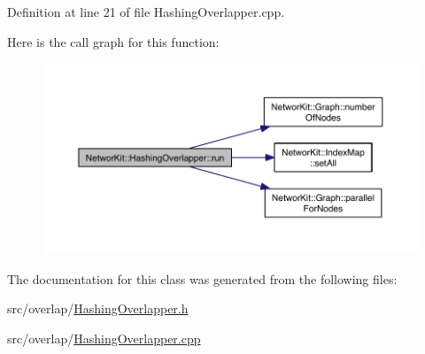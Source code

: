 Definition at line 21 of file Hashing\-Overlapper.\-cpp.



Here is the call graph for this function\-:\nopagebreak
\begin{figure}[H]
\begin{center}
\leavevmode
\includegraphics[width=350pt]{class_networ_kit_1_1_hashing_overlapper_a3a4272d1c135ce07e37e1fff03d21a7d_cgraph}
\end{center}
\end{figure}




The documentation for this class was generated from the following files\-:\begin{DoxyCompactItemize}
\item 
src/overlap/\hyperlink{_hashing_overlapper_8h}{Hashing\-Overlapper.\-h}\item 
src/overlap/\hyperlink{_hashing_overlapper_8cpp}{Hashing\-Overlapper.\-cpp}\end{DoxyCompactItemize}
